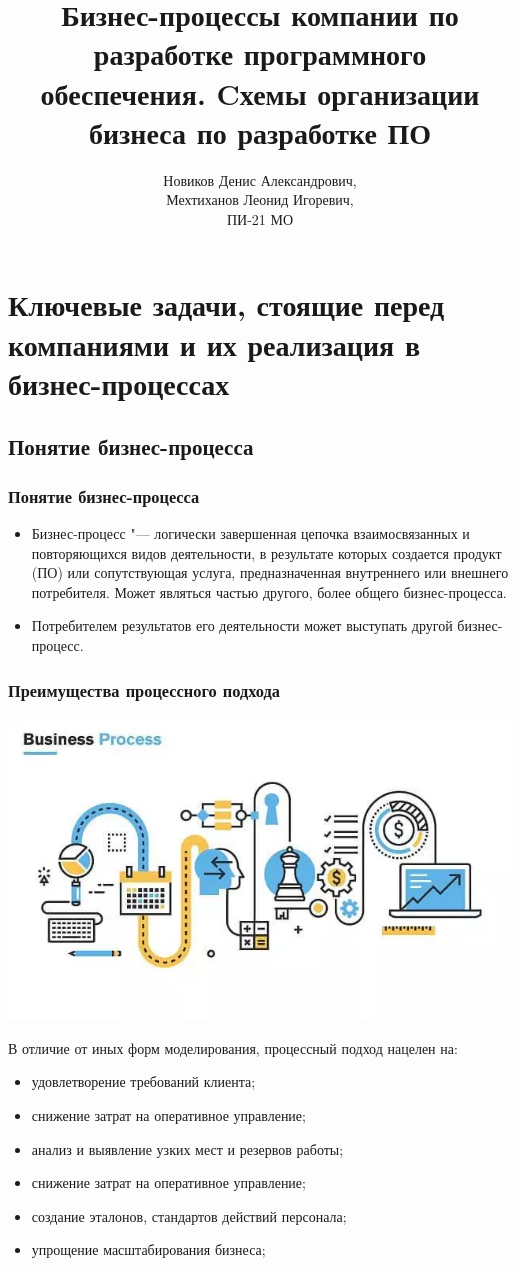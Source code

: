 \documentclass{../industrial-development}
\title{Бизнес-процессы компании по разработке программного обеспечения.
	Cхемы организации бизнеса по разработке ПО}
\author{Новиков Денис Александрович, \\Мехтиханов Леонид Игоревич, \\ПИ-21 МО}
\date{}
\begin{document}
\begin{frame}
  \titlepage
\end{frame}


\section{Ключевые задачи, стоящие перед компаниями и их реализация в бизнес-процессах}

\subsection{Понятие бизнес-процесса}


\begin{frame} \frametitle{Понятие бизнес-процесса}
	\begin{itemize}
		\item Бизнес-процесс "--- логически завершенная цепочка взаимосвязанных и повторяющихся видов деятельности, в результате которых создается продукт (ПО) или сопутствующая услуга, предназначенная внутреннего или внешнего потребителя. Может являться частью другого, более общего бизнес-процесса.
		\item Потребителем результатов его деятельности может выступать другой бизнес-процесс.
	\end{itemize}
\end{frame}
\lecturenotes


\begin{frame} \frametitle{Преимущества процессного подхода}
	\centerline{\includegraphics[height=0.25\textheight]{image8.png}}
	В отличие от иных форм моделирования, процессный подход нацелен на:
	\begin{itemize}
		\item удовлетворение требований клиента;
		\item снижение затрат на оперативное управление;
		\item анализ и выявление узких мест и резервов работы;
		\item снижение затрат на оперативное управление;
		\item создание эталонов, стандартов действий персонала;
		\item упрощение масштабирования бизнеса;
	\end{itemize}
\end{frame}
\lecturenotes
\end{document}
